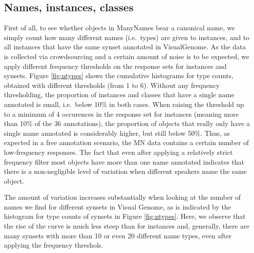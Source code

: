 \subsection{Names, instances, classes}

First of all, to see whether objects in ManyNames bear a canonical name, we simply count how many different names (i.e.\ types) are given to instances, and to all instances that have the same synset annotated in VisualGenome. 
As the data is collected via crowdsourcing and a certain amount of noise is to be expected, we apply different frequency thresholds on the response sets for instances and synsets.
Figure \ref{fig:ntypes} shows the cumulative histograms for type counts, obtained with different thresholds (from 1 to 6).
Without any frequency thresholding, the proportion of instances and classes that have a single name annotated is small, i.e.\ below 10\% in both cases. When raising the threshold up to a minimum of 4 occurences in the response set  for instances (meaning more than 10\% of the 36 annotations), the proportion of objects that really only have a single name annotated is considerably higher, but still below 50\%.
Thus, as expected in a free annotation scenario, the MN data contains a certain number of low-frequency responses.
The fact that even after applying a relatively strict frequency filter most objects have more than one name annotated indicates that there is a non-negligible  level of variation when different speakers name the same object.

The amount of variation increases substantially when looking at the number of names we find for different synsets in Visual Genome, as is indicated by the histogram for type counts of synsets in Figure \ref{fig:ntypes}.
Here, we observe that the rise of the curve is much less steep than for instances and, generally, there are many synsets with more than 10 or even 20 different name types, even after applying the frequency threshols.

